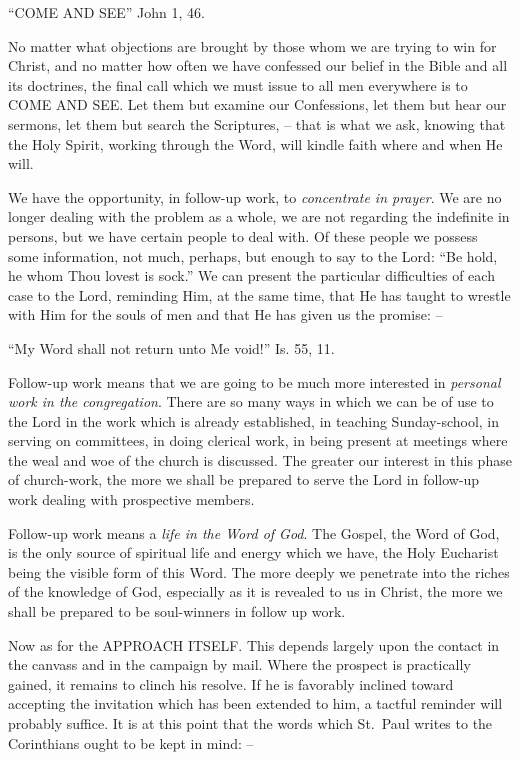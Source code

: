 \documentclass[
]{book}
\begin{document}
``COME AND SEE'' John 1, 46.

No matter what objections are brought by those whom we are trying to win for Christ, and no matter how often we have confessed our belief in the Bible and all its doctrines, the final call which we must issue to all men everywhere is to COME AND SEE. Let them but examine our Confessions, let them but hear our sermons, let them but search the Scriptures, -- that is what we ask, knowing that the Holy Spirit, working through the Word, will kindle faith where and when He will.

We have the opportunity, in follow-up work, to \emph{concentrate in prayer}. We are no longer dealing with the problem as a whole, we are not regarding the indefinite in persons, but we have certain people to deal with. Of these people we possess some information, not much, perhaps, but enough to say to the Lord: ``Be hold, he whom Thou lovest is sock.'' We can present the particular difficulties of each case to the Lord, reminding Him, at the same time, that He has taught to wrestle with Him for the souls of men and that He has given us the promise: --

``My Word shall not return unto Me void!'' Is. 55, 11.

Follow-up work means that we are going to be much more interested in \emph{personal work in the congregation}. There are so many ways in which we can be of use to the Lord in the work which is already established, in teaching Sunday-school, in serving on committees, in doing clerical work, in being present at meetings where the weal and woe of the church is discussed. The greater our interest in this phase of church-work, the more we shall be prepared to serve the Lord in follow-up work dealing with prospective members.

Follow-up work means a \emph{life in the Word of God}. The Gospel, the Word of God, is the only source of spiritual life and energy which we have, the Holy Eucharist being the visible form of this Word. The more deeply we penetrate into the riches of the knowledge of God, especially as it is revealed to us in Christ, the more we shall be prepared to be soul-winners in follow up work.

Now as for the APPROACH ITSELF. This depends largely upon the contact in the canvass and in the campaign by mail. Where the prospect is practically gained, it remains to clinch his resolve. If he is favorably inclined toward accepting the invitation which has been extended to him, a tactful reminder will probably suffice. It is at this point that the words which St.~Paul writes to the Corinthians ought to be kept in mind: --
\end{document}
